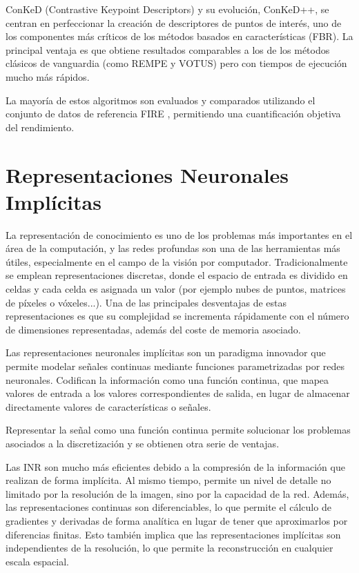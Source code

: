ConKeD (Contrastive Keypoint Descriptors) y su evolución, ConKeD++, se centran en perfeccionar la creación de descriptores de puntos de interés, uno de los componentes más críticos de los métodos basados en características (FBR).
La principal ventaja es que obtiene resultados comparables a los de los métodos clásicos de vanguardia (como REMPE y VOTUS) pero con tiempos de ejecución mucho más rápidos.

La mayoría de estos algoritmos son evaluados y comparados utilizando el conjunto de datos de referencia FIRE \cite{FIRE}, permitiendo una cuantificación objetiva del rendimiento.

\section{Representaciones Neuronales Implícitas}
\label{sec:Representación Neuronais Implícitas}

La representación de conocimiento es uno de los problemas más importantes en el área de la computación, y las redes profundas son una de las herramientas más útiles, especialmente en el campo de la visión por computador.
Tradicionalmente se emplean representaciones discretas, donde el espacio de entrada es dividido en celdas y cada celda es asignada un valor (por ejemplo nubes de puntos, matrices de píxeles o vóxeles...).
Una de las principales desventajas de estas representaciones es que su complejidad se incrementa rápidamente con el número de dimensiones representadas, además del coste de memoria asociado.

Las representaciones neuronales implícitas son un paradigma innovador que permite modelar señales continuas mediante funciones parametrizadas por redes neuronales.
Codifican la información como una función continua, que mapea valores de entrada a los valores correspondientes de salida, en lugar de almacenar directamente valores de características o señales.

Representar la señal como una función continua permite solucionar los problemas asociados a la discretización y se obtienen otra serie de ventajas.

Las INR son mucho más eficientes debido a la compresión de la información que realizan de forma implícita. Al mismo tiempo, permite un nivel de detalle no limitado por la resolución de la imagen, sino por la capacidad de la red.
Además, las representaciones continuas son diferenciables, lo que permite el cálculo de gradientes y derivadas de forma analítica en lugar de tener que aproximarlos por diferencias finitas.
Esto también implica que las representaciones implícitas son independientes de la resolución, lo que permite la reconstrucción en cualquier escala espacial.

